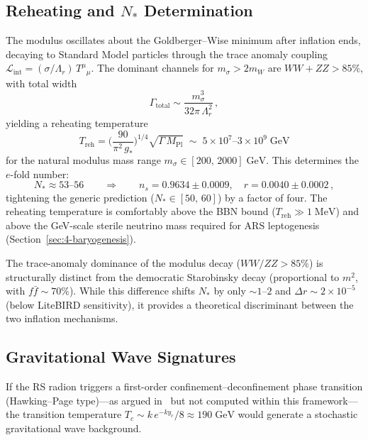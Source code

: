 \subsection{Reheating and $N_*$ Determination}
\label{sec:4-reheating}

The modulus oscillates about the Goldberger--Wise minimum after inflation ends, decaying to Standard Model particles through the trace anomaly coupling $\mathcal{L}_{\mathrm{int}} = (\sigma/\Lambda_r)\, T^\mu{}_\mu$.  The dominant channels for $m_\sigma > 2m_W$ are $WW + ZZ > 85\%$, with total width
\begin{equation}
  \Gamma_{\mathrm{total}} \sim \frac{m_\sigma^3}{32\pi\, \Lambda_r^2}\,,
  \label{eq:4-Gamma-reh}
\end{equation}
yielding a reheating temperature
\begin{equation}
  T_{\mathrm{reh}} = \biggl(\frac{90}{\pi^2\, g_*}\biggr)^{1/4}\!\sqrt{\Gamma\, M_{\mathrm{Pl}}}
  \;\sim\; 5 \times 10^7\text{--}3 \times 10^9\;\mathrm{GeV}
  \label{eq:4-Treh}
\end{equation}
for the natural modulus mass range $m_\sigma \in [200,\, 2000]\;\mathrm{GeV}$.  This determines the $e$-fold number:
\begin{equation}
  N_* \approx 53\text{--}56 \qquad \Longrightarrow \qquad
  n_s = 0.9634 \pm 0.0009, \quad r = 0.0040 \pm 0.0002\,,
  \label{eq:4-Nstar-reh}
\end{equation}
tightening the generic prediction ($N_* \in [50,\, 60]$) by a factor of four.  The reheating temperature is comfortably above the BBN bound ($T_{\mathrm{reh}} \gg 1\;\mathrm{MeV}$) and above the GeV-scale sterile neutrino mass required for ARS leptogenesis (Section~\ref{sec:4-baryogenesis}).

The trace-anomaly dominance of the modulus decay ($WW/ZZ > 85\%$) is structurally distinct from the democratic Starobinsky decay (proportional to $m^2$, with $f\bar{f} \sim 70\%$).  While this difference shifts $N_*$ by only $\sim 1$--$2$ and $\Delta r \sim 2 \times 10^{-5}$ (below LiteBIRD sensitivity), it provides a theoretical discriminant between the two inflation mechanisms.


\subsection{Gravitational Wave Signatures}
\label{sec:4-gw-signatures}

If the RS radion triggers a first-order confinement--deconfinement phase transition (Hawking--Page type)---as argued in~\cite{ch4:Creminelli2002,ch4:Nardini2007} but not computed within this framework---the transition temperature $T_c \sim k\, e^{-ky_c}/8 \approx 190\;\mathrm{GeV}$ would generate a stochastic gravitational wave background.

